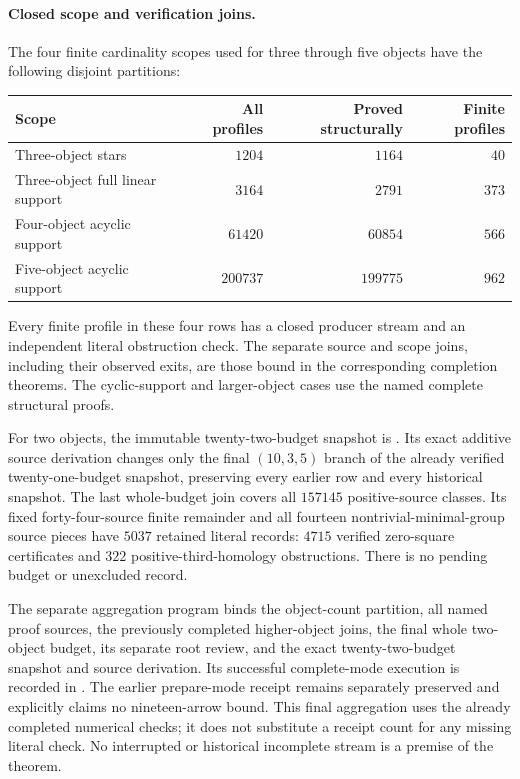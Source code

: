 \paragraph{Closed scope and verification joins.}
The four finite cardinality scopes used for three through five
objects have the following disjoint partitions:
\begin{center}
\begin{tabular}{lrrr}
\hline
Scope & All profiles & Proved structurally & Finite profiles\\
\hline
Three-object stars & $1204$ & $1164$ & $40$\\
Three-object full linear support & $3164$ & $2791$ & $373$\\
Four-object acyclic support & $61420$ & $60854$ & $566$\\
Five-object acyclic support & $200737$ & $199775$ & $962$\\
\hline
\end{tabular}
\end{center}
Every finite profile in these four rows has a closed producer
stream and an independent literal obstruction check.  The separate
source and scope joins, including their observed exits, are those
bound in the corresponding completion theorems.  The cyclic-support
and larger-object cases use the named complete structural proofs.

For two objects, the immutable twenty-two-budget snapshot is
.
Its exact additive source derivation changes only the final
$(10,3,5)$ branch of the already verified twenty-one-budget
snapshot, preserving every earlier row and every historical
snapshot.  The last whole-budget join covers all $157145$
positive-source classes.  Its fixed forty-four-source finite
remainder and all fourteen nontrivial-minimal-group source pieces
have $5037$ retained literal records: $4715$ verified zero-square
certificates and $322$ positive-third-homology obstructions.
There is no pending budget or unexcluded record.

The separate aggregation program
binds the object-count partition, all named proof sources,
the previously completed higher-object joins, the final whole
two-object budget, its separate root review, and the exact
twenty-two-budget snapshot and source derivation.
Its successful complete-mode execution is recorded in
.
The earlier prepare-mode receipt remains separately preserved
and explicitly claims no nineteen-arrow bound.
This final aggregation uses the already completed numerical
checks; it does not substitute a receipt count for any missing
literal check.  No interrupted or historical incomplete stream
is a premise of the theorem.
